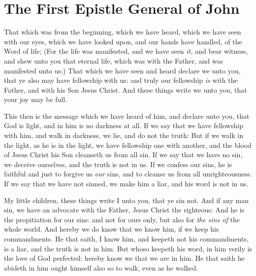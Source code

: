 \documentclass[11pt,letterpaper,oneside]{memoir}
\begin{document}
\chapter[1 John]{The First Epistle General of John}
That which was from the beginning, which we have heard, which we have
seen with our eyes, which we have looked upon, and our hands have
handled, of the Word of life; (For the life was manifested, and we have
seen \emph{it,} and bear witness, and shew unto you that eternal life,
which was with the Father, and was manifested unto us;) That which we
have seen and heard declare we unto you, that ye also may have
fellowship with us: and truly our fellowship \emph{is} with the Father,
and with his Son Jesus Christ. And these things write we unto you, that
your joy may be full.

This then is the message which we have heard of him, and declare unto
you, that God is light, and in him is no darkness at all. If we say that
we have fellowship with him, and walk in darkness, we lie, and do not
the truth: But if we walk in the light, as he is in the light, we have
fellowship one with another, and the blood of Jesus Christ his Son
cleanseth us from all sin. If we say that we have no sin, we deceive
ourselves, and the truth is not in us. If we confess our sins, he is
faithful and just to forgive us \emph{our} sins, and to cleanse us from
all unrighteousness. If we say that we have not sinned, we make him a
liar, and his word is not in us.

My little children, these things write I unto you, that ye sin not. And
if any man sin, we have an advocate with the Father, Jesus Christ the
righteous: And he is the propitiation for our sins: and not for ours
only, but also for \emph{the sins of} the whole world. And hereby we do
know that we know him, if we keep his commandments. He that saith, I
know him, and keepeth not his commandments, is a liar, and the truth is
not in him. But whoso keepeth his word, in him verily is the love of God
perfected: hereby know we that we are in him. He that saith he abideth
in him ought himself also so to walk, even as he walked.
\end{document}
